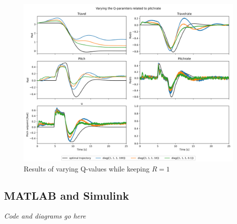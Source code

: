 \documentclass[../main.tex]{subfiles}
\begin{document}
\begin{figure}[h]
	\includegraphics[width=\linewidth]{figures/LAB3_Q_variations_pitchrate.png}
	\caption{Results of varying Q-values while keeping $R=1$}
	\label{fig:LAB3_Q_variations_pitchrate}
\end{figure}


\clearpage

\subsection{MATLAB and Simulink}
\textit{Code and diagrams go here}
\end{document}
